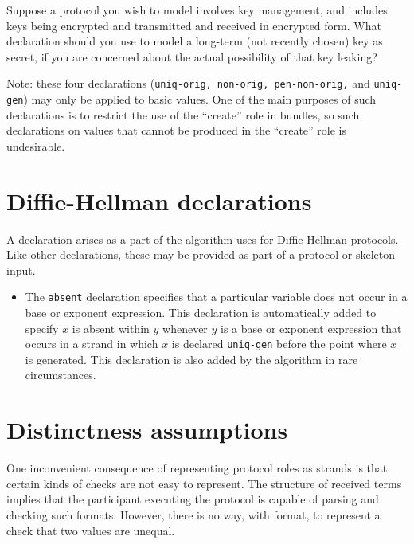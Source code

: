 \begin{exercise}
Suppose a protocol you wish to model involves key management, and
includes keys being encrypted and transmitted and received in
encrypted form.  What declaration should you use to model a long-term
(not recently chosen) key as secret, if you are concerned about the
actual possibility of that key leaking?
\end{exercise}

Note: these four declarations (\texttt{uniq-orig, non-orig,
  pen-non-orig,} and \texttt{uniq-gen}) may only be applied to basic
values.  One of the main purposes of such declarations is to restrict
the use of the ``create'' role in bundles, so such declarations on
values that cannot be produced in the ``create'' role is undesirable.

\section{Diffie-Hellman declarations}
A declaration arises as a part of the algorithm {\cpsa} uses for
Diffie-Hellman protocols.  Like other declarations, these may be
provided as part of a protocol or skeleton input.

\begin{itemize}

  \item {} The \texttt{absent} declaration specifies
    that a particular  variable does not occur in a base or
    exponent expression.  This declaration is automatically added to
    specify $x$ is absent within $y$ whenever $y$ is a base or
    exponent expression that occurs in a strand in which $x$ is
    declared \texttt{uniq-gen} before the point where $x$ is
    generated.  This declaration is also added by the algorithm in
    rare circumstances.
\end{itemize}

\iffalse

\section{Distinctness assumptions}
\label{sec:distinct_decls}

One inconvenient consequence of representing protocol roles as strands
is that certain kinds of checks are not easy to represent.  The
structure of received terms implies that the participant executing the
protocol is capable of parsing and checking such formats.  However,
there is no way, with format, to represent a check that two values are
unequal.

